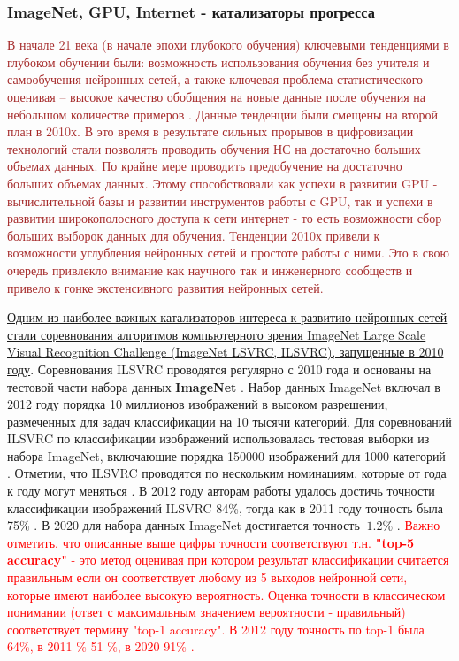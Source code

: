 \documentclass[12pt]{article}
\begin{document}
\begin{sloppypar}
\subsubsection{ImageNet, GPU, Internet - катализаторы прогресса}
\textcolor{brown}{
В начале 21 века (в начале эпохи глубокого обучения) ключевыми тенденциями в глубоком обучении были:  возможность использования обучения без учителя и самообучения нейронных сетей, а также ключевая проблема статистического оценивая – высокое качество обобщения на новые данные после обучения на небольшом количестве примеров \cite{goodfellow2016deep}. Данные тенденции были смещены на второй план в 2010х. В это время в результате сильных прорывов в цифровизации технологий стали позволять проводить обучения НС на достаточно больших объемах данных. По крайне мере проводить предобучение на достаточно больших объемах данных. Этому способствовали как успехи в развитии GPU - вычислительной базы и развитии инструментов работы с GPU, так и успехи в развитии широкополосного доступа к сети интернет - то есть возможности сбор больших выборок данных для обучения. Тенденции 2010х привели к возможности углубления нейронных сетей и простоте работы с ними. Это в свою очередь привлекло внимание как научного так и инженерного сообществ и привело к гонке экстенсивного развития нейронных сетей.}

\uline{Одним из наиболее важных катализаторов интереса к развитию нейронных сетей стали соревнования  алгоритмов компьютерного зрения ImageNet Large Scale Visual Recognition Challenge  (ImageNet LSVRC, ILSVRC), запущенные в 2010 году}. Соревнования ILSVRC проводятся регулярно с 2010 года и основаны на тестовой части набора данных \textbf{ImageNet} \cite{imagenetcvpr09, ILSVRC15}. Набор данных ImageNet включал в 2012 году порядка 10 миллионов изображений в высоком разрешении, размеченных для задач классификации на 10 тысячи категорий. Для соревнований ILSVRC по классификации изображений использовалась тестовая выборки из набора ImageNet, включающие порядка 150000 изображений для 1000 категорий \cite{ILSVRC2012, ILSVRC15}. Отметим, что ILSVRC проводятся по нескольким номинациям, которые от года к году могут меняться \cite{ILSVRC15}. В 2012 году авторам работы \cite{krizhevsky2012imagenet} удалось достичь точности классификации изображений ILSVRC 84\%, тогда как в 2011 году точность была 75\% \cite{ILSVRC15}. В 2020 для набора данных ImageNet достигается точность $~ 1.2\%$ \cite{paperswithcodeImagenet}. \textcolor{red}{Важно отметить, что описанные выше цифры точности соответствуют т.н. \textbf{"top-5 accuracy"} - это метод оценивая при котором результат классификации считается правильным если он соответствует любому из 5 выходов нейронной сети, которые имеют наиболее высокую вероятность. Оценка точности в классическом понимании (ответ с максимальным значением вероятности - правильный) соответствует термину "top-1 accuracy". В 2012 году точность по top-1 была 64\%, в 2011 \% 51 \%, в 2020 91\% \cite{paperswithcodeImagenet}.}


\end{sloppypar}
\end{document}

